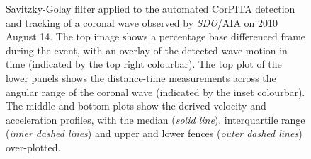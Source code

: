 \documentclass[structabstract]{aa}
\begin{document}
\begin{figure}[!t]
\centering
{}
\caption{Savitzky-Golay filter applied to the automated CorPITA detection and tracking of a coronal wave observed by \emph{SDO}/AIA on 2010 August 14. The top image shows a percentage base differenced frame during the event, with an overlay of the detected wave motion in time (indicated by the top right colourbar). The top plot of the lower panels shows the distance-time measurements across the angular range of the coronal wave (indicated by the inset colourbar). The middle and bottom plots show the derived velocity and acceleration profiles, with the median (\emph{solid line}), interquartile range (\emph{inner dashed lines}) and upper and lower fences (\emph{outer dashed lines}) over-plotted.}
\label{fig_savgol_wave_CorPITA}
\end{figure}
\end{document}
